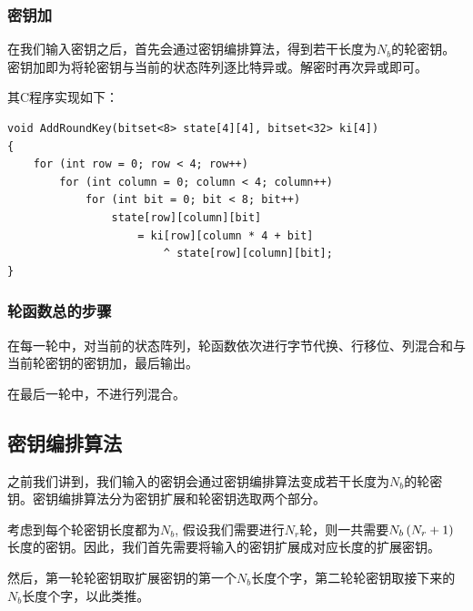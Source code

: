 \subsubsection{密钥加}
在我们输入密钥之后，首先会通过密钥编排算法，得到若干长度为$N_b$的轮密钥。密钥加即为将轮密钥与当前的状态阵列逐比特异或。解密时再次异或即可。\par
其C程序实现如下：
\begin{prove}
\begin{verbatim}
void AddRoundKey(bitset<8> state[4][4], bitset<32> ki[4])
{
    for (int row = 0; row < 4; row++)
        for (int column = 0; column < 4; column++)
            for (int bit = 0; bit < 8; bit++)
                state[row][column][bit]
                    = ki[row][column * 4 + bit]
                        ^ state[row][column][bit];
}
\end{verbatim}
\end{prove}
\subsubsection{轮函数总的步骤}
在每一轮中，对当前的状态阵列，轮函数依次进行字节代换、行移位、列混合和与当前轮密钥的密钥加，最后输出。\par
在最后一轮中，不进行列混合。
\subsection{密钥编排算法}
之前我们讲到，我们输入的密钥会通过密钥编排算法变成若干长度为$N_b$的轮密钥。密钥编排算法分为密钥扩展和轮密钥选取两个部分。\par
考虑到每个轮密钥长度都为$N_b$, 假设我们需要进行$N_r$轮，则一共需要$N_b\left( {N_r+1}\right)$长度的密钥。因此，我们首先需要将输入的密钥扩展成对应长度的扩展密钥。\par
然后，第一轮轮密钥取扩展密钥的第一个$N_b$长度个字，第二轮轮密钥取接下来的$N_b$长度个字，以此类推。\par
